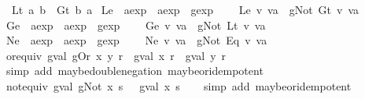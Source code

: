 \begin{isabellebody}
\ \ {\isachardoublequoteopen}Lt\ a\ b\ {\isasymequiv}\ Gt\ b\ a{\isachardoublequoteclose}\isanewline
\isanewline
{}\isamarkupfalse%
\ Le\ {\isacharcolon}{\isacharcolon}\ {\isachardoublequoteopen}aexp\ {\isasymRightarrow}\ aexp\ {\isasymRightarrow}\ gexp{\isachardoublequoteclose}\ \ \isanewline
\ \ {\isachardoublequoteopen}Le\ v\ va\ {\isasymequiv}\ gNot\ {\isacharparenleft}Gt\ v\ va{\isacharparenright}{\isachardoublequoteclose}\isanewline
\isanewline
{}\isamarkupfalse%
\ Ge\ {\isacharcolon}{\isacharcolon}\ {\isachardoublequoteopen}aexp\ {\isasymRightarrow}\ aexp\ {\isasymRightarrow}\ gexp{\isachardoublequoteclose}\ \ \isanewline
\ \ {\isachardoublequoteopen}Ge\ v\ va\ {\isasymequiv}\ gNot\ {\isacharparenleft}Lt\ v\ va{\isacharparenright}{\isachardoublequoteclose}\isanewline
\isanewline
{}\isamarkupfalse%
\ Ne\ {\isacharcolon}{\isacharcolon}\ {\isachardoublequoteopen}aexp\ {\isasymRightarrow}\ aexp\ {\isasymRightarrow}\ gexp{\isachardoublequoteclose}\ \ \isanewline
\ \ {\isachardoublequoteopen}Ne\ v\ va\ {\isasymequiv}\ gNot\ {\isacharparenleft}Eq\ v\ va{\isacharparenright}{\isachardoublequoteclose}\isanewline
\isanewline
{}\isamarkupfalse%
\ or{\isacharunderscore}equiv{\isacharcolon}\ {\isachardoublequoteopen}gval\ {\isacharparenleft}gOr\ x\ y{\isacharparenright}\ r\ {\isacharequal}\ {\isacharparenleft}gval\ x\ r{\isacharparenright}\ {\isasymor}\isactrlsub {\isacharquery}\ {\isacharparenleft}gval\ y\ r{\isacharparenright}{\isachardoublequoteclose}\isanewline
%
\isadelimproof
\ \ %
\endisadelimproof
%
\isatagproof
{}\isamarkupfalse%
\ {\isacharparenleft}simp\ add{\isacharcolon}\ maybe{\isacharunderscore}double{\isacharunderscore}negation\ maybe{\isacharunderscore}or{\isacharunderscore}idempotent{\isacharparenright}%
\endisatagproof
{\isafoldproof}%
%
\isadelimproof
\isanewline
%
\endisadelimproof
\isanewline
{}\isamarkupfalse%
\ not{\isacharunderscore}equiv{\isacharcolon}\ {\isachardoublequoteopen}gval\ {\isacharparenleft}gNot\ x{\isacharparenright}\ s\ {\isacharequal}\ {\isasymnot}\isactrlsub {\isacharquery}\ {\isacharparenleft}gval\ x\ s{\isacharparenright}{\isachardoublequoteclose}\isanewline
%
\isadelimproof
\ \ %
\endisadelimproof
%
\isatagproof
{}\isamarkupfalse%
\ {\isacharparenleft}simp\ add{\isacharcolon}\ maybe{\isacharunderscore}or{\isacharunderscore}idempotent{\isacharparenright}%
\endisatagproof
{\isafoldproof}%
%
\isadelimproof
\isanewline
%
\endisadelimproof
\isanewline

\end{isabellebody}
